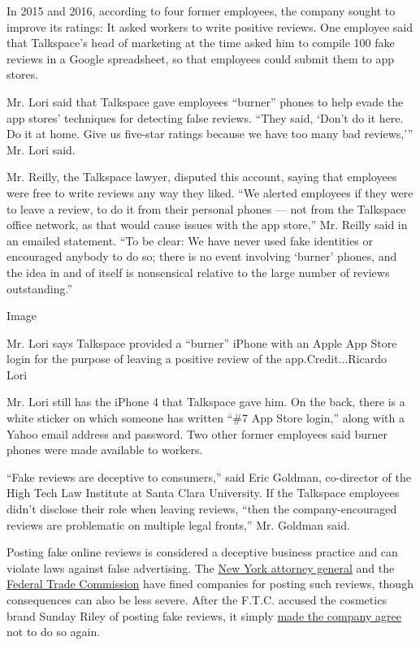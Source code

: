 In 2015 and 2016, according to four former employees, the company sought
to improve its ratings: It asked workers to write positive reviews. One
employee said that Talkspace's head of marketing at the time asked him
to compile 100 fake reviews in a Google spreadsheet, so that employees
could submit them to app stores.

Mr. Lori said that Talkspace gave employees ``burner'' phones to help
evade the app stores' techniques for detecting false reviews. ``They
said, `Don't do it here. Do it at home. Give us five-star ratings
because we have too many bad reviews,''' Mr. Lori said.

Mr. Reilly, the Talkspace lawyer, disputed this account, saying that
employees were free to write reviews any way they liked. ``We alerted
employees if they were to leave a review, to do it from their personal
phones --- not from the Talkspace office network, as that would cause
issues with the app store,'' Mr. Reilly said in an emailed statement.
``To be clear: We have never used fake identities or encouraged anybody
to do so; there is no event involving `burner' phones, and the idea in
and of itself is nonsensical relative to the large number of reviews
outstanding.''

Image

Mr. Lori says Talkspace provided a ``burner'' iPhone with an Apple App
Store login for the purpose of leaving a positive review of the
app.Credit...Ricardo Lori~

Mr. Lori still has the iPhone 4 that Talkspace gave him. On the back,
there is a white sticker on which someone has written ``\#7 App Store
login,'' along with a Yahoo email address and password. Two other former
employees said burner phones were made available to workers.

``Fake reviews are deceptive to consumers,'' said Eric Goldman,
co-director of the High Tech Law Institute at Santa Clara University. If
the Talkspace employees didn't disclose their role when leaving reviews,
``then the company-encouraged reviews are problematic on multiple legal
fronts,'' Mr. Goldman said.

Posting fake online reviews is considered a deceptive business practice
and can violate laws against false advertising. The
\href{https://ag.ny.gov/press-release/2013/ag-schneiderman-announces-agreement-19-companies-stop-writing-fake-online-reviews}{New
York attorney general} and the
\href{https://www.ftc.gov/news-events/press-releases/2019/02/ftc-brings-first-case-challenging-fake-paid-reviews-independent}{Federal
Trade Commission} have fined companies for posting such reviews, though
consequences can also be less severe. After the F.T.C. accused the
cosmetics brand Sunday Riley of posting fake reviews, it simply
\href{https://www.nytimes.com/2019/10/22/us/sunday-riley-fake-reviews.html}{made
the company agree} not to do so again.

